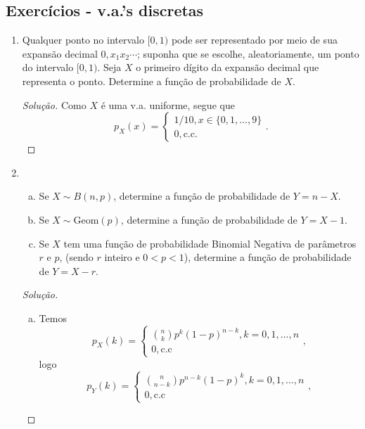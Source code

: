 \documentclass[../Notas.tex]{subfiles}
\begin{document}
\subsection{Exercícios - v.a.'s discretas}

\begin{enumerate}
    \item Qualquer ponto no intervalo $[0, 1)$ pode ser representado por meio de sua expansão decimal $0, x_1x_2\cdots$; suponha que se escolhe, aleatoriamente, um ponto do intervalo $[0, 1)$. Seja $X$ o primeiro dígito da expansão decimal que representa o ponto. Determine a função de probabilidade de $X$.
    \begin{proof}[Solução]
        Como $X$ é uma v.a. uniforme, segue que
        \[
        p_X(x) = \begin{cases}
        1/10, x\in\{0, 1, \dots, 9\} \\
        0, \text{c.c.}
        \end{cases}.
        \]
    \end{proof}
    \item \begin{enumerate}[a)]
        \item Se $X\sim B(n, p)$, determine a função de probabilidade de $Y = n - X$.
        \item Se $X\sim \text{Geom}(p)$, determine a função de probabilidade de $Y = X - 1$.
        \item Se $X$ tem uma função de probabilidade Binomial Negativa de parâmetros $r$ e $p$, (sendo $r$ inteiro e $0 < p < 1$), determine a função de probabilidade de $Y = X - r$.
    \end{enumerate}
    \begin{proof}[Solução]
        \begin{enumerate}[a)]
            \item Temos
            \[
            p_X(k) = \begin{cases}
            \binom{n}{k}p^k(1-p)^{n-k}, k = 0,1,\dots,n \\
            0, \text{c.c}
            \end{cases},
            \]
            logo
            \[
            p_Y(k) = \begin{cases}
            \binom{n}{n-k}p^{n-k}(1-p)^{k}, k = 0, 1, \dots, n \\
            0, \text{c.c}
            \end{cases},
\]
\end{enumerate}
\end{proof}
\end{enumerate}
\end{document}
